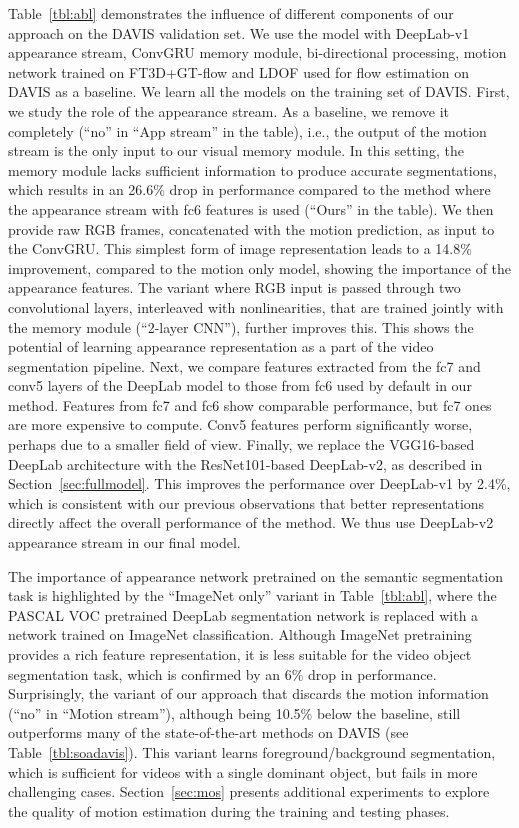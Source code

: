 Table~\ref{tbl:abl} demonstrates the influence of different components of our
approach on the DAVIS validation set. We use the model with DeepLab-v1 appearance stream, ConvGRU memory module, bi-directional processing, motion network trained on FT3D+GT-flow and LDOF used for flow estimation on DAVIS as a baseline. We learn all the models on the training set of DAVIS. First, we study the role of the
appearance stream. As a baseline, we remove it completely (``no'' in ``App
stream'' in the table), i.e., the output of the motion stream is the only input
to our visual memory module. In this setting, the memory module lacks
sufficient information to produce accurate segmentations, which results in an
26.6\% drop in performance compared to the method where the appearance stream
with fc6 features is used (``Ours'' in the table). We then provide raw RGB
frames, concatenated with the motion prediction, as input to the ConvGRU. This
simplest form of image representation leads to a 14.8\% improvement, compared
to the motion only model, showing the importance of the appearance features.
The variant where RGB input is passed through two convolutional layers,
interleaved with  nonlinearities, that are trained jointly with the
memory module (``2-layer CNN''), further improves this. This shows the
potential of learning appearance representation as a part of the video
segmentation pipeline. Next, we compare features extracted from the fc7 and
conv5 layers of the DeepLab model to those from fc6 used by default in our
method. Features from fc7 and fc6 show comparable performance, but fc7 ones are
more expensive to compute. Conv5 features perform significantly worse, perhaps
due to a smaller field of view. Finally, we replace the VGG16-based DeepLab
architecture with the ResNet101-based DeepLab-v2, as described in
Section~\ref{sec:fullmodel}. This improves the performance over DeepLab-v1 by
2.4\%, which is consistent with our previous observations that better
representations directly affect the overall performance of the method. We thus
use DeepLab-v2 appearance stream in our final model.

The importance of appearance network pretrained on the semantic segmentation
task is highlighted by the ``ImageNet only'' variant in Table~\ref{tbl:abl},
where the PASCAL VOC pretrained DeepLab segmentation network is replaced with a
network trained on ImageNet classification. Although ImageNet pretraining
provides a rich feature representation, it is less suitable for the video
object segmentation task, which is confirmed by an 6\% drop in performance.
Surprisingly, the variant of our approach that discards the motion information (``no'' in ``Motion stream''), although being 10.5\% below the baseline, still outperforms many of the state-of-the-art methods on DAVIS (see Table~\ref{tbl:soadavis}). This variant learns foreground/background segmentation, which is sufficient for videos with a
single dominant object, but fails in more challenging cases.
Section~\ref{sec:mos} presents additional experiments to explore the quality of
motion estimation during the training and testing phases.

